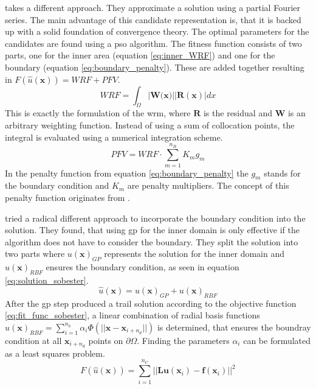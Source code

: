 \documentclass[./\jobname.tex]{subfiles}
\begin{document}
\cite{babaei_general_2013} takes a different approach. They approximate a solution using a partial Fourier series. The main advantage of this candidate representation is, that it is backed up with a solid foundation of convergence theory. The optimal parameters for the candidates are found using a \gls{pso} algorithm. The fitness function consists of two parts, one for the inner area (equation \ref{eq:inner_WRF}) and one for the boundary (equation \ref{eq:boundary_penalty}). These are added together resulting in $F(\hat{u}(\mathbf{x})) = WRF + PFV$.
\begin{equation}
\label{eq:inner_WRF}
WRF = \int_{\Omega} |\mathbf{W}(\mathbf{x)}| |\mathbf{R}(\mathbf{x})| dx
\end{equation}
This is exactly the formulation of the \gls{wrm}, where $\mathbf{R}$ is the residual and $\mathbf{W}$ is an arbitrary weighting function. Instead of using a sum of collocation points, the integral is evaluated using a numerical integration scheme. 
\begin{equation}
\label{eq:boundary_penalty}
PFV = WRF \cdot \sum_{m=1}^{n_B} K_m g_m
\end{equation}
In the penalty function from equation \ref{eq:boundary_penalty} the $g_m$ stands for the boundary condition and $K_m$ are penalty multipliers. The concept of this penalty function originates from \cite{rajeev_s_discrete_1992}. 

\cite{sobester_genetic_2008} tried a radical different approach to incorporate the boundary condition into the solution. They found, that using \gls{gp} for the inner domain is only effective if the algorithm does not have to consider the boundary. They split the solution into two parts where $u(\mathbf{x})_{GP}$ represents the solution for the inner domain and $u(\mathbf{x})_{RBF}$ ensures the boundary condition, as seen in equation \ref{eq:solution_sobester}. 
\begin{equation}
\label{eq:solution_sobester}
\hat{u}(\mathbf{x}) = u(\mathbf{x})_{GP} + u(\mathbf{x})_{RBF}
\end{equation}
After the \gls{gp} step produced a trail solution according to the objective function \ref{eq:fit_func_sobester}, a linear combination of radial basis functions $u(\mathbf{x})_{RBF} = \sum_{i=1}^{n_b} \alpha_i \Phi (||\mathbf{x}-\mathbf{x}_{i+n_d}||)$ is determined, that ensures the boundray condition at all $\mathbf{x}_{i+n_d}$ points on $\partial \Omega$. Finding the parameters $\alpha_i$ can be formulated as a least squares problem. 
\begin{equation}
\label{eq:fit_func_sobester}
F(\hat{u}(\mathbf{x})) = \sum_{i=1}^{n_C} || \mathbf{Lu}(\mathbf{x}_i) - \mathbf{f}(\mathbf{x}_i)||^2
\end{equation}
\end{document}
